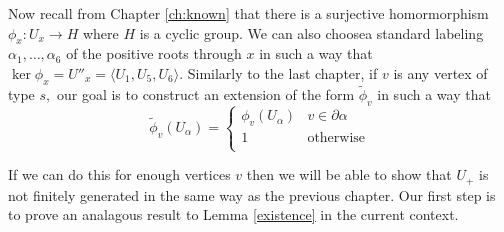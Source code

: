 \documentclass[class=book, crop=false]{standalone}
\begin{document}
Now recall from Chapter \ref{ch:known} that there is a surjective homormorphism $\phi_x:U_x\to H$ where $H$ is a cyclic group. We can also choosea standard labeling $\alpha_1,\dots,\alpha_6$ of the positive roots through $x$ in such a way that $\ker \phi_x=U''_x=\langle U_1,U_5,U_6\rangle.$ Similarly to the last chapter, if $v$ is any vertex of type $s,$ our goal is to construct an extension of the form $\tilde{\phi}_v$ in such a way that
\[
	\tilde{\phi}_v(U_\alpha)=\begin{cases}\phi_v(U_\alpha)&v\in \partial\alpha\\
		1&\text{otherwise}\\
\end{cases}
	\]

	If we can do this for enough vertices $v$ then we will be able to show that $U_+$ is not finitely generated in the same way as the previous chapter. Our first step is to prove an analagous result to Lemma \ref{existence} in the current context.
\end{document}
